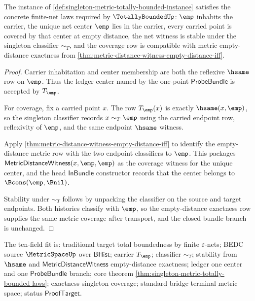 \begin{theorem}
\label{thm:singleton-metric-totally-bounded-laws}
The instance of
\autoref{def:singleton-metric-totally-bounded-instance} satisfies the concrete
finite-net laws required by $\TotallyBoundedUp$: $\emp$ inhabits the carrier,
the unique net center $\emp$ lies in the carrier, every carried point is covered
by that center at empty distance, the net witness is stable under the singleton
classifier $\sim_T$, and the coverage row is compatible with metric
empty-distance exactness from
\autoref{thm:metric-distance-witness-empty-distance-iff}.
\end{theorem}
\begin{proof}
Carrier inhabitation and center membership are both the reflexive $\hsame$ row
on $\emp$. Thus the ledger center named by the one-point
$\mathsf{ProbeBundle}$ is accepted by $T_{\emp}$.

For coverage, fix a carried point $x$. The row $T_{\emp}(x)$ is exactly
$\hsame(x,\emp)$, so the singleton classifier records $x\sim_T \emp$ using the
carried endpoint row, reflexivity of $\emp$, and the same endpoint
$\hsame$ witness.

Apply \autoref{thm:metric-distance-witness-empty-distance-iff} to identify the
empty-distance metric row with the two endpoint classifiers to $\emp$. This
packages $\mathsf{MetricDistanceWitness}(x,\emp,\emp)$ as the coverage witness
for the unique center, and the head $\mathsf{InBundle}$ constructor records
that the center belongs to $\Bcons(\emp,\Bnil)$.

Stability under $\sim_T$ follows by unpacking the classifier on the source and
target endpoints. Both histories classify with $\emp$, so the empty-distance
exactness row supplies the same metric coverage after transport, and the closed
bundle branch is unchanged.
\end{proof}

The ten-field fit is: traditional target total boundedness by finite
$\varepsilon$-nets; BEDC source $\MetricSpaceUp$ over $\mathsf{BHist}$; carrier
$T_{\emp}$; classifier $\sim_T$; stability from $\hsame$ and
$\mathsf{MetricDistanceWitness}$ empty-distance exactness; ledger one center
and one $\mathsf{ProbeBundle}$ branch; core theorem
\autoref{thm:singleton-metric-totally-bounded-laws}; exactness singleton
coverage; standard bridge terminal metric space; status $\mathsf{ProofTarget}$.

